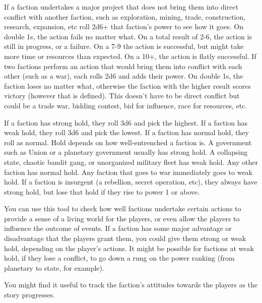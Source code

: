 If a faction undertakes a major project that does not bring them into direct conflict with another
faction, such as exploration, mining, trade, construction, research, expansion, etc roll 2d6+ that
faction’s power to see how it goes. On double 1s, the action fails no matter what. On a total result
of 2-6, the action is still in progress, or a failure. On a 7-9 the action is successful, but might take
more time or resources than expected. On a 10+, the action is flatly successful.
If two factions perform an action that would bring them into conflict with each other (such
as a war), each rolls 2d6 and adds their power. On double 1s, the faction loses no matter what,
otherwise the faction with the higher result scores victory (however that is defined). This doesn’t
have to be direct conflict but could be a trade war, bidding contest, bid for influence, race for
resources, etc.

If a faction has strong hold, they roll 3d6 and pick the highest. If a faction has weak hold, they roll
3d6 and pick the lowest. If a faction has normal hold, they roll as normal. Hold depends on how
well-entrenched a faction is. A government such as Union or a planetary government usually has
strong hold. A collapsing state, chaotic bandit gang, or unorganized military fleet has weak hold.
Any other faction has normal hold. Any faction that goes to war immediately goes to weak hold. If
a faction is insurgent (a rebellion, secret operation, etc), they always have strong hold, but lose
that hold if they rise to power 1 or above.

You can use this tool to check how well factions undertake certain actions to provide a sense of a
living world for the players, or even allow the players to influence the outcome of events. If a
faction has some major advantage or disadvantage that the players grant them, you could give
them strong or weak hold, depending on the player’s actions. It might be possible for factions at
weak hold, if they lose a conflict, to go down a rung on the power ranking (from planetary to state,
for example).

You might find it useful to track the faction’s attitudes towards the players as the story progresses.

